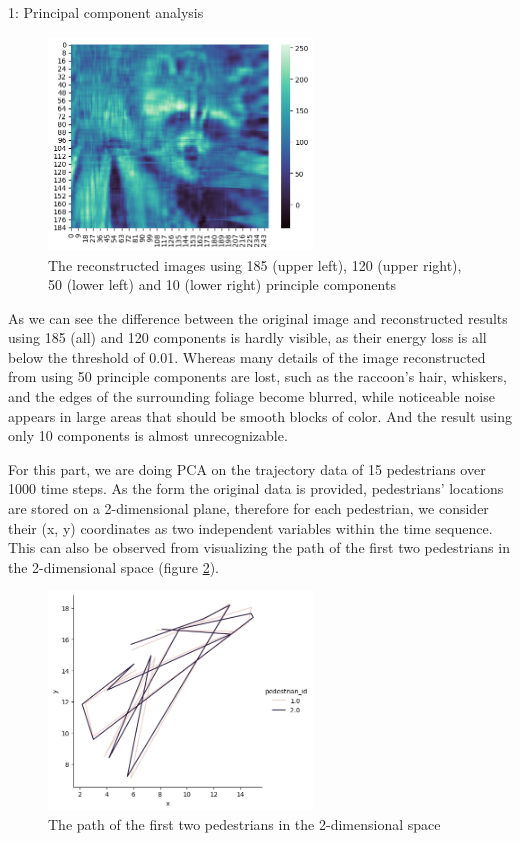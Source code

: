 \documentclass[10pt,a4paper]{article}
\begin{document}
\begin{task}{1: Principal component analysis}
\begin{figure} [H]
    \includegraphics[width=7cm]{images/task1-2-10.png}
    \caption{The reconstructed images using 185 (upper left), 120 (upper right), 50 (lower left) and 10 (lower right) principle components}
    \label{fig:task1-2-3}
\end{figure}

As we can see the difference between the original image and reconstructed results using 185 (all) and 120 components is hardly visible, as their energy loss is all below the threshold of 0.01. Whereas many details of the image reconstructed from using 50 principle components are lost, such as the raccoon's hair, whiskers, and the edges of the surrounding foliage become blurred, while noticeable noise appears in large areas that should be smooth blocks of color. And the result using only 10 components is almost unrecognizable. 

\bigskip
{}

For this part, we are doing PCA on the trajectory data of 15 pedestrians over 1000 time steps. As the form the original data is provided, pedestrians' locations are stored on a 2-dimensional plane, therefore for each pedestrian, we consider their (x, y) coordinates as two independent variables within the time sequence. This can also be observed from visualizing the path of the first two pedestrians in the 2-dimensional space (figure \ref{fig:task1-3-1}).

\begin{figure} [H]
    \centering
    \includegraphics[width=7cm]{images/task1-3-1.png}
    \caption{The path of the first two pedestrians in the 2-dimensional space}
    \label{fig:task1-3-1}
\end{figure}


\end{task}
\end{document}
